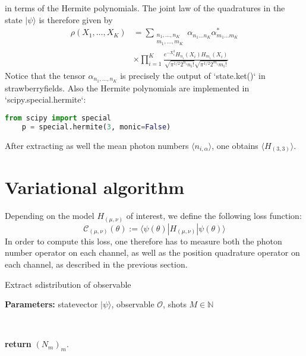 \documentclass[reprint, amsmath, amssymb, aps]{revtex4-2}
\begin{document}
    in terms of the Hermite polynomials. The joint law of the quadratures in the state $|\psi\rangle$ is therefore given by
    \begin{equation}
    \begin{split}
        \rho(X_1,\dots,X_{K}) &= \sum_{\substack{n_1,\dots,n_{K} \\ m_1,\dots,m_{K}}} \alpha_{n_1\dots n_{K}}\alpha^*_{m_1\dots m_{K}}\\
        &\times\prod_{i=1}^{K}\frac{e^{-X_i^2}H_{n_i}(X_i)H_{m_i}(X_i)}{\sqrt{\pi^{1/2}2^{n_i}n_i!}\sqrt{\pi^{1/2}2^{m_i}m_i!}}
    \end{split}
    \end{equation}
    Notice that the tensor $\alpha_{n_1,\dots,n_{K}}$ is precisely the output of `state.ket()` in strawberryfields.
    Also the Hermite polynomials are implemented in `scipy.special.hermite`:
    \begin{lstlisting}[language=Python]
    from scipy import special
    p = special.hermite(3, monic=False)
    \end{lstlisting}

    After extracting as well the mean photon numbers $\langle n_{i,\alpha}\rangle$, one obtains $\langle H_{(3,3)}\rangle$.

\section{Variational algorithm}

    Depending on the model $H_{(\mu,\nu)}$ of interest, we define the following loss function:
    \begin{equation}
        \mathcal C_{(\mu,\nu)}(\theta) := \langle\psi(\theta)|H_{(\mu,\nu)}|\psi(\theta)\rangle
    \end{equation}
    In order to compute this loss, one therefore has to measure both the photon number operator on each channel, as well as the position quadrature operator on each channel, as described in the previous section.
    \newpage

    \begin{algorithm}
        \caption{Extract sdistribution of observable}\label{alg:statistics_computation}
            \textbf{Parameters:} statevector $|\psi\rangle$, observable $\mathcal O$, shots $M\in\mathbb N$

            \

            \textbf{return} $(N_m)_m$.
    \end{algorithm}
\end{document}
